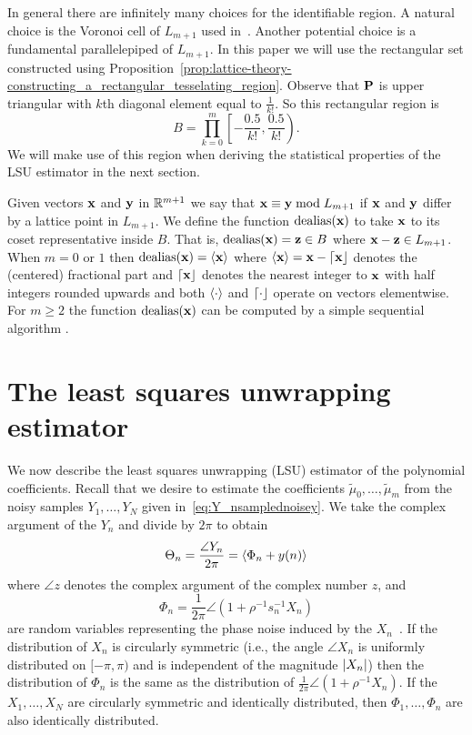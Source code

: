 \documentclass[journal]{IEEEtran}
\begin{document}
In general there are infinitely many choices for the identifiable region. A natural choice is the Voronoi cell of $L_{m+1}$ used in~\cite{McKilliam2009IndentifiabliltyAliasingPolyphase}. Another potential choice is a fundamental parallelepiped of $L_{m+1}$. In this paper we will use the rectangular set constructed using Proposition~\ref{prop:lattice-theory-constructing_a_rectangular_tesselating_region}. Observe that $\mathbf{P}$ is upper triangular with $k$th diagonal element equal to $\tfrac{1}{k!}$.  So this rectangular region is
\begin{equation}\label{eq:rectangular_identifiable_region}
B = \prod_{k=0}^{m}\left[ -\frac{0.5}{k!}, \frac{0.5}{k!}  \right).
\end{equation}
We will make use of this region when deriving the statistical properties of the LSU estimator in the next section. 

Given vectors $\mathbf{x}$ and $\mathbf{y}$ in ${\mathbb R}^{m+1}$ we say that $\mathbf{x} \equiv \mathbf{y} \bmod L_{m+1}$ if $\mathbf{x}$ and $\mathbf{y}$ differ by a lattice point in $L_{m+1}$.  We define the function $\operatorname{dealias}(\mathbf{x})$ to take $\mathbf{x}$ to its coset representative inside $B$. That is, $\operatorname{dealias}(\mathbf{x}) = \mathbf{z} \in B$ where $\mathbf{x} - \mathbf{z} \in L_{m+1}$.  %
When $m = 0$ or $1$ then $\operatorname{dealias}(\mathbf{x}) = \left\langle \mathbf{x} \right\rangle$ where $\left\langle \mathbf{x} \right\rangle = \mathbf{x} - {\left\lceil \mathbf{x} \right\rfloor}$ denotes the (centered) fractional part and ${\left\lceil \mathbf{x} \right\rfloor}$ denotes the nearest integer to $\mathbf{x}$ with half integers rounded upwards and both $\left\langle \cdot \right\rangle$ and ${\left\lceil \cdot \right\rfloor}$ operate on vectors elementwise.  For $m \geq 2$ the function $\operatorname{dealias}(\mathbf{x})$ can be computed by a simple sequential algorithm \cite[Sec. 7.2.1]{McKilliam2010thesis}.

\section{The least squares unwrapping estimator}\label{sec:least-squar-unwr}

We now describe the least squares unwrapping (LSU) estimator of the polynomial coefficients. Recall that we desire to estimate the coefficients $\tilde{\mu}_0, \dots, \tilde{\mu}_m$ from the noisy samples $Y_1, \dots, Y_N$ given in~\eqref{eq:Y_nsamplednoisey}.  We take the complex argument of the $Y_n$ and divide by $2\pi$ to obtain
\begin{equation}\label{eq:noise_circ_poly}
\Theta_n = \frac{\angle{Y_n}}{2\pi} = \fracpart{ \Phi_n + y(n) }
\end{equation}
where $\angle{z}$ denotes the complex argument of the complex number $z$, and 
\[
\Phi_n = \frac{1}{2\pi}\angle(1 + \rho^{-1}s_n^{-1}X_n)
\] 
are random variables representing the phase noise induced by the $X_n$~\cite{Tretter1985,Quinn2009_dasp_phase_only_information_loss}.  If the distribution of $X_n$ is circularly symmetric (i.e., the angle $\angle X_n$ is uniformly distributed on $[-\pi, \pi)$ and is independent of the magnitude $\left\vert X_n \right\vert$) then the distribution of $\Phi_n$ is the same as the distribution of $\tfrac{1}{2\pi}\angle(1 + \rho^{-1}X_n)$.  If the $X_1, \dots, X_N$ are circularly symmetric and identically distributed, then $\Phi_1, \dots, \Phi_n$ are also identically distributed.
\end{document}
